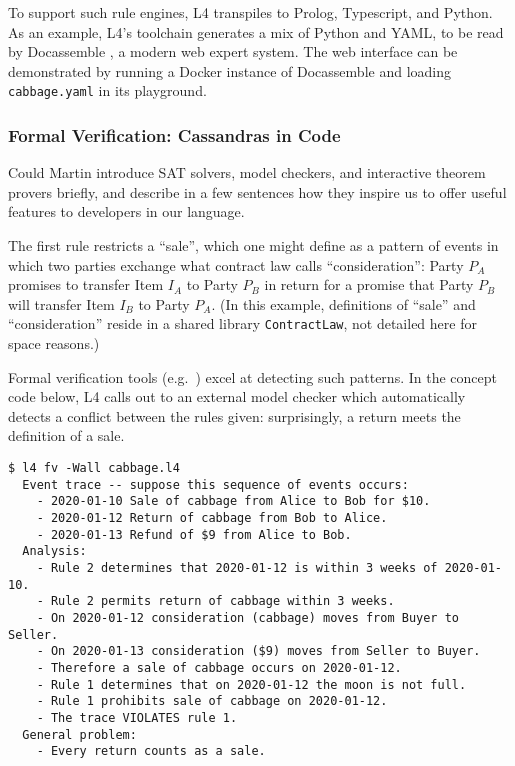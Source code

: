 \documentclass{IOS-Book-Article}
\begin{document}
To support such rule engines, L4 transpiles to Prolog, Typescript, and Python. As an example, L4's toolchain generates a mix of Python and YAML, to be read by Docassemble \cite{pyle_docassemble_nodate}, a modern web expert system. The web interface can be demonstrated by running a Docker instance of Docassemble and loading \texttt{cabbage.yaml} in its playground.

\subsubsection{Formal Verification: Cassandras in Code}

Could Martin introduce SAT solvers, model checkers, and interactive theorem provers briefly, and describe in a few sentences how they inspire us to offer useful features to developers in our language.

The first rule restricts a ``sale'', which one might define as a pattern of events in which two parties exchange what contract law calls ``consideration'': Party $P_A$ promises to transfer Item $I_A$ to Party $P_B$ in return for a promise that Party $P_B$ will transfer Item $I_B$ to Party $P_A$. (In this example, definitions of ``sale'' and ``consideration'' reside in a shared library \texttt{ContractLaw}, not detailed here for space reasons.)

Formal verification tools (e.g.\ \cite{larsen_uppaal_1997, sun_pat_2009}) excel at detecting such patterns. In the concept code below, L4 calls out to an external model checker which automatically detects a conflict between the rules given: surprisingly, a return meets the definition of a sale.

\begin{lstlisting}
$ l4 fv -Wall cabbage.l4
  Event trace -- suppose this sequence of events occurs:
    - 2020-01-10 Sale of cabbage from Alice to Bob for $10.
    - 2020-01-12 Return of cabbage from Bob to Alice.
    - 2020-01-13 Refund of $9 from Alice to Bob.
  Analysis:
    - Rule 2 determines that 2020-01-12 is within 3 weeks of 2020-01-10.
    - Rule 2 permits return of cabbage within 3 weeks.
    - On 2020-01-12 consideration (cabbage) moves from Buyer to Seller.
    - On 2020-01-13 consideration ($9) moves from Seller to Buyer.
    - Therefore a sale of cabbage occurs on 2020-01-12.
    - Rule 1 determines that on 2020-01-12 the moon is not full.
    - Rule 1 prohibits sale of cabbage on 2020-01-12.
    - The trace VIOLATES rule 1.
  General problem:
    - Every return counts as a sale.
\end{lstlisting}
\end{document}
